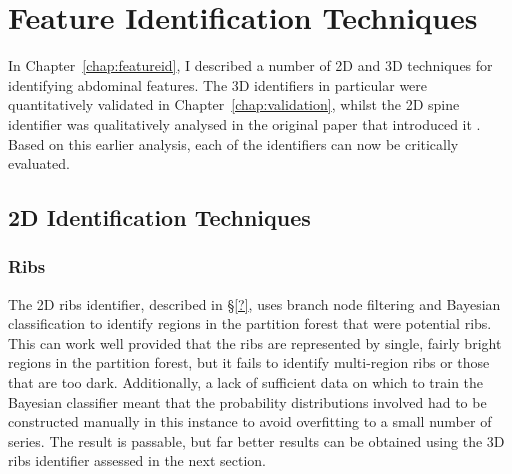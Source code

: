 \section{Feature Identification Techniques}

In Chapter~\ref{chap:featureid}, I described a number of 2D and 3D techniques for identifying abdominal features. The 3D identifiers in particular were quantitatively validated in Chapter~\ref{chap:validation}, whilst the 2D spine identifier was qualitatively analysed in the original paper that introduced it \cite{gvcispa09}. Based on this earlier analysis, each of the identifiers can now be critically evaluated.

\subsection{2D Identification Techniques}

\subsubsection{Ribs}

The 2D ribs identifier, described in \S\ref{?}, uses branch node filtering and Bayesian classification to identify regions in the partition forest that were potential ribs. This can work well provided that the ribs are represented by single, fairly bright regions in the partition forest, but it fails to identify multi-region ribs or those that are too dark. Additionally, a lack of sufficient data on which to train the Bayesian classifier meant that the probability distributions involved had to be constructed manually in this instance to avoid overfitting to a small number of series. The result is passable, but far better results can be obtained using the 3D ribs identifier assessed in the next section.

